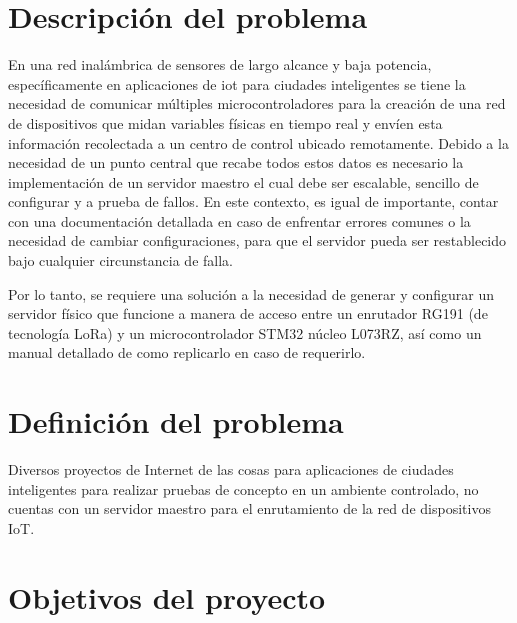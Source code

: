 
\section{Descripción del problema} \label{descripcionproblema}

En una red inalámbrica de sensores de largo alcance y baja potencia, específicamente en aplicaciones
de \gls{iot} para ciudades inteligentes se tiene la necesidad de comunicar múltiples
microcontroladores para la creación de una red de dispositivos que midan variables físicas en tiempo
real y envíen esta información recolectada a un centro de control ubicado remotamente. Debido a la
necesidad de un punto central que recabe todos estos datos es necesario la implementación de un
servidor maestro el cual debe ser escalable, sencillo de configurar y a prueba de fallos. En este
contexto, es igual de importante, contar con una documentación detallada en caso de enfrentar
errores comunes o la necesidad de cambiar configuraciones, para que el servidor pueda ser
restablecido bajo cualquier circunstancia de falla.

Por lo tanto, se requiere una solución a la necesidad de generar y configurar un servidor físico que
funcione a manera de acceso entre un enrutador RG191 (de tecnología LoRa) y un microcontrolador
STM32 núcleo L073RZ, así como un manual detallado de como replicarlo en caso de requerirlo.

\section{Definición del problema} \label{definicionproblema}

Diversos proyectos de Internet de las cosas para aplicaciones de ciudades inteligentes para realizar
pruebas de concepto en un ambiente controlado, no cuentas con un servidor maestro para el
enrutamiento de la red de dispositivos IoT.

\section{Objetivos del proyecto} \label{objetivoinvestigacion}

